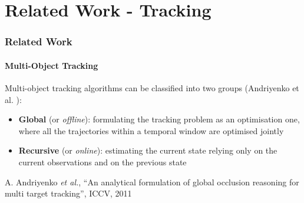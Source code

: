 \section{Related Work - Tracking}

\begin{frame}
	\frametitle{Related Work}
	\framesubtitle{Multi-Object Tracking}
	
	\Large
	
	\vspace{0.6cm}
	
	Multi-object tracking algorithms can be classified into two groups (Andriyenko et al.
	\cite{Andriyenko11}):
	
	\begin{itemize}
		\item \textbf{Global} (or \emph{offline}): formulating the tracking problem as an optimisation
			  one, where all the trajectories within a temporal window are optimised jointly
		\item \textbf{Recursive} (or \emph{online}): estimating the current state relying only on the
			  current observations and on the previous state
	\end{itemize}
	
	\vspace{0.82cm}
	
	\tiny
	
	\cite{Andriyenko11} A. Andriyenko \emph{et al.}, ``An analytical formulation of global occlusion
	reasoning for multi target tracking'', ICCV, 2011
\end{frame}

